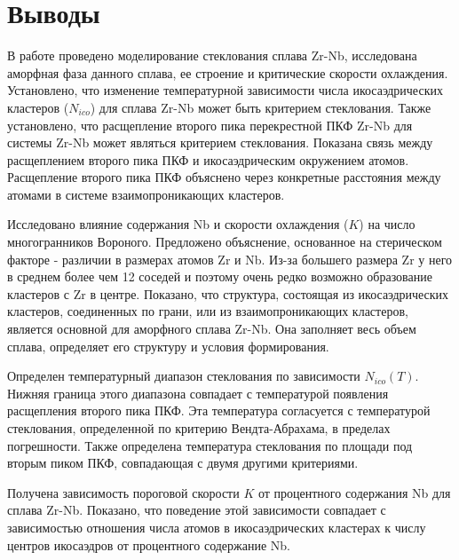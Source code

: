 \chapter*{Выводы}
В работе проведено моделирование стеклования сплава Zr-Nb, исследована аморфная фаза данного сплава, ее строение и критические скорости охлаждения. Установлено, что изменение температурной зависимости числа икосаэдрических кластеров ($N_{ico}$) для сплава Zr-Nb может быть критерием стеклования. Также установлено, что расщепление второго пика перекрестной ПКФ Zr-Nb для системы Zr-Nb может являться критерием стеклования. Показана связь между расщеплением второго пика ПКФ и икосаэдрическим окружением атомов. Расщепление второго пика ПКФ объяснено через конкретные расстояния между атомами в системе взаимопроникающих кластеров.

Исследовано влияние содержания Nb и скорости охлаждения ($K$) на число многогранников Вороного. Предложено объяснение, основанное на  стерическом факторе - различии в размерах атомов Zr и Nb. Из-за большего размера Zr у него в среднем более чем 12 соседей и поэтому очень редко возможно образование кластеров с Zr в центре. Показано, что структура, состоящая  из икосаэдрических кластеров, соединенных по грани, или из взаимопроникающих кластеров, является основной для аморфного сплава Zr-Nb. Она заполняет весь объем сплава, определяет его структуру и условия формирования.  

Определен температурный диапазон стеклования по  зависимости $N_{ico}(T)$. Нижняя граница этого диапазона  совпадает с температурой появления  расщепления второго пика ПКФ. Эта температура согласуется  с температурой стеклования, определенной по критерию Вендта-Абрахама, в пределах погрешности. Также определена температура стеклования по площади под вторым пиком ПКФ, совпадающая с двумя другими критериями.  


Получена зависимость пороговой скорости $K$ от процентного содержания Nb для сплава Zr-Nb. Показано, что поведение этой зависимости совпадает с зависимостью отношения числа атомов в икосаэдрических кластерах к числу центров икосаэдров от процентного содержание Nb.